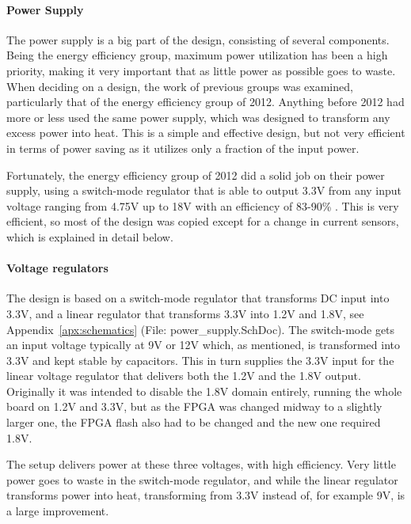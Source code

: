 
\paragraph{Power Supply}

The power supply is a big part of the design, consisting of several components.
Being the energy efficiency group, maximum power utilization has been a high
priority, making it very important that as little power as possible goes to
waste. When deciding on a design, the work of previous groups was examined,
particularly that of the energy efficiency group of 2012. Anything before 2012
had more or less used the same power supply, which was designed to transform any
excess power into heat. This is a simple and effective design, but not very
efficient in terms of power saving as it utilizes only a fraction of the input
power.

Fortunately, the energy efficiency group of 2012 did a solid job on their power
supply, using a switch-mode regulator that is able to output 3.3V from any input
voltage ranging from 4.75V up to 18V with an efficiency of 83-90\% . This is very efficient, so most of the design
was copied except for a change in current sensors, which is explained in detail
below.

\paragraph{Voltage regulators}

The design is based on a switch-mode regulator that transforms DC input into
3.3V, and a linear regulator
that transforms 3.3V into 1.2V and 1.8V, see Appendix~\ref{apx:schematics}
(File: power\_supply.SchDoc). The switch-mode gets an input voltage typically at
9V or 12V which, as mentioned, is transformed into 3.3V and kept stable by
capacitors. This in turn supplies the 3.3V input for the linear voltage
regulator that delivers both the 1.2V and the 1.8V output. Originally it was
intended to disable the 1.8V domain entirely, running the whole board on 1.2V
and 3.3V, but as the FPGA was changed midway to a slightly larger one, the FPGA
flash also had to be changed and the new one required 1.8V.

The setup
delivers power at these three voltages, with high efficiency. Very little power
goes to waste in the switch-mode regulator, and while the linear regulator
transforms power into heat, transforming from 3.3V instead of, for example 9V,
is a large improvement.

